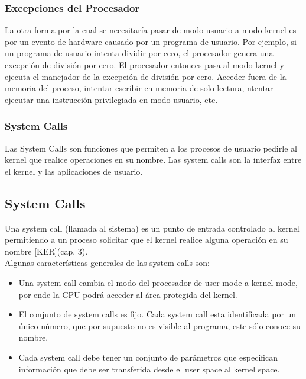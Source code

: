 \documentclass[../main.tex]{subfiles}
\begin{document}
        \subsubsection*{Excepciones del Procesador}
            La otra forma por la cual se necesitaría pasar de modo usuario a modo kernel es por un evento de hardware causado por un programa de usuario. Por ejemplo, si un programa de usuario intenta dividir por cero, el procesador genera una excepción de división por cero. El procesador entonces pasa al modo kernel y ejecuta el manejador de la excepción de división por cero. Acceder fuera de la memoria del proceso, intentar escribir en memoria de solo lectura, ntentar ejecutar una instrucción privilegiada en modo usuario, etc.


        \subsubsection*{System Calls}
            Las System Calls son funciones que permiten a los procesos de usuario pedirle al kernel que realice operaciones en su nombre. Las system calls son la interfaz entre el kernel y las aplicaciones de usuario.\\

    \subsection{System Calls}
        Una system call (llamada al sistema) es un punto de entrada controlado al kernel permitiendo a un proceso solicitar que el kernel realice alguna operación en su nombre [KER](cap. 3).\\

        Algunas características generales de las system calls son:
        \begin{itemize}
            \item Una system call cambia el modo del procesador de user mode a kernel mode, por ende la CPU podrá acceder al área protegida del kernel.
            \item El conjunto de system calls es fijo. Cada system call esta identificada por un único número, que por supuesto no es visible al programa, este sólo conoce su nombre.
            \item Cada system call debe tener un conjunto de parámetros que especifican información que debe ser transferida desde el user space al kernel space.
        \end{itemize}
\end{document}
